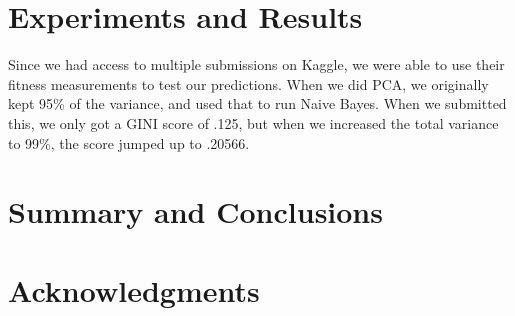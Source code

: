 \documentclass[fleqn,10pt]{SelfArx} %
\begin{document}
\bigskip
\bigskip
\section{Experiments and Results}
Since we had access to multiple submissions on Kaggle, we were able to use their fitness measurements to test our predictions. When we did PCA, we originally kept 95\% of the variance, and used that to run Naive Bayes. When we submitted this, we only got a GINI score of .125, but when we increased the total variance to 99\%, the score jumped up to .20566.  




\bigskip
\bigskip
\section{Summary and Conclusions}
\bigskip
\bigskip
\bigskip



\section*{Acknowledgments} %







\end{document}
